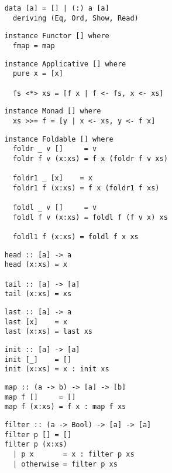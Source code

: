 \begin{multicols}{2}
	\begin{verbatim}
	data [a] = [] | (:) a [a]
	  deriving (Eq, Ord, Show, Read)
	\end{verbatim}
	
	\begin{verbatim}
	instance Functor [] where 
	  fmap = map
	\end{verbatim}
	
	\begin{verbatim}
	instance Applicative [] where
	  pure x = [x]
	  
	  fs <*> xs = [f x | f <- fs, x <- xs]
	\end{verbatim}
	
	\begin{verbatim}
	instance Monad [] where 
	  xs >>= f = [y | x <- xs, y <- f x]
	\end{verbatim}
	
	\begin{verbatim}
	instance Foldable [] where 
	  foldr _ v []     = v 
	  foldr f v (x:xs) = f x (foldr f v xs)
	  
	  foldr1 _ [x]    = x 
	  foldr1 f (x:xs) = f x (foldr1 f xs)
	  
	  foldl _ v []     = v 
	  foldl f v (x:xs) = foldl f (f v x) xs
	  
	  foldl1 f (x:xs) = foldl f x xs
	\end{verbatim}
	
	\begin{verbatim}
	head :: [a] -> a 
	head (x:xs) = x
	
	tail :: [a] -> [a]
	tail (x:xs) = xs
	\end{verbatim}
	
	\begin{verbatim}
	last :: [a] -> a
	last [x]    = x
	last (x:xs) = last xs
	\end{verbatim}
	
	\begin{verbatim}
	init :: [a] -> [a]
	init [_]    = []
	init (x:xs) = x : init xs
	\end{verbatim}
	
	\begin{verbatim}
	map :: (a -> b) -> [a] -> [b]
	map f []     = []
	map f (x:xs) = f x : map f xs
	\end{verbatim}
	
	\begin{verbatim}
	filter :: (a -> Bool) -> [a] -> [a]
	filter p [] = []
	filter p (x:xs)
	  | p x       = x : filter p xs
	  | otherwise = filter p xs
	\end{verbatim}
	

\end{multicols}
